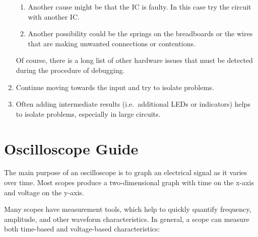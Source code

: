 \documentclass[12pt, logo=tehranDLDL/ut]{tehranDLDL}
\begin{document}
\begin{enumerate}
\begin{enumerate}
        \item Another cause might be that the IC is faulty. In this case try the circuit with another IC. 
        \item Another possibility could be the springs on the breadboards or the wires that are making unwanted connections or contentions.
    \end{enumerate}
    Of course, there is a long list of other hardware issues that must be detected during the procedure of debugging. 
    \item Continue moving towards the input and try to isolate problems.
    \item Often adding intermediate results (i.e.\ additional LEDs or indicators) helps to isolate problems, especially in large circuits.
\end{enumerate}

\section{Oscilloscope Guide}

The main purpose of an oscilloscope is to graph an electrical signal as it varies over time. Most scopes produce a two-dimensional graph with time on the x-axis and voltage on the y-axis. 

Many scopes have measurement tools, which help to quickly quantify frequency, amplitude, and other waveform characteristics. In general, a scope can measure both time-based and voltage-based characteristics:
\end{document}

